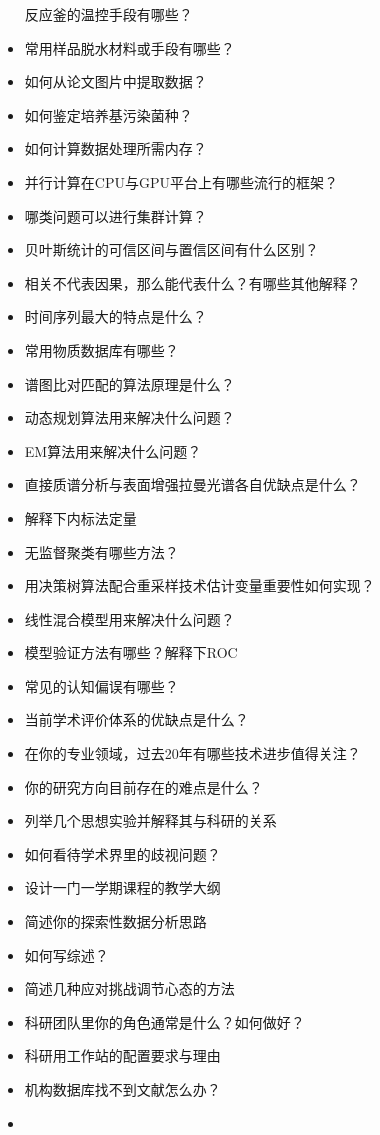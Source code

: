 \documentclass[]{tufte-book}
\begin{document}
\begin{itemize}
  反应釜的温控手段有哪些？
\item
  常用样品脱水材料或手段有哪些？
\item
  如何从论文图片中提取数据？
\item
  如何鉴定培养基污染菌种？
\item
  如何计算数据处理所需内存？
\item
  并行计算在CPU与GPU平台上有哪些流行的框架？
\item
  哪类问题可以进行集群计算？
\item
  贝叶斯统计的可信区间与置信区间有什么区别？
\item
  相关不代表因果，那么能代表什么？有哪些其他解释？
\item
  时间序列最大的特点是什么？
\item
  常用物质数据库有哪些？
\item
  谱图比对匹配的算法原理是什么？
\item
  动态规划算法用来解决什么问题？
\item
  EM算法用来解决什么问题？
\item
  直接质谱分析与表面增强拉曼光谱各自优缺点是什么？
\item
  解释下内标法定量
\item
  无监督聚类有哪些方法？
\item
  用决策树算法配合重采样技术估计变量重要性如何实现？
\item
  线性混合模型用来解决什么问题？
\item
  模型验证方法有哪些？解释下ROC
\item
  常见的认知偏误有哪些？
\item
  当前学术评价体系的优缺点是什么？
\item
  在你的专业领域，过去20年有哪些技术进步值得关注？
\item
  你的研究方向目前存在的难点是什么？
\item
  列举几个思想实验并解释其与科研的关系
\item
  如何看待学术界里的歧视问题？
\item
  设计一门一学期课程的教学大纲
\item
  简述你的探索性数据分析思路
\item
  如何写综述？
\item
  简述几种应对挑战调节心态的方法
\item
  科研团队里你的角色通常是什么？如何做好？
\item
  科研用工作站的配置要求与理由
\item
  机构数据库找不到文献怎么办？
\item

\end{itemize}
\end{document}
